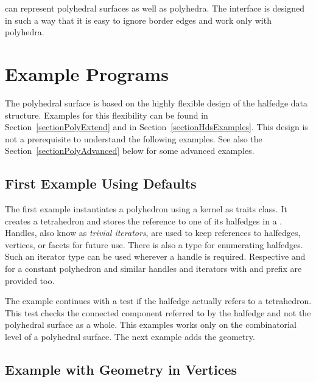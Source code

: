  can represent polyhedral
surfaces as well as polyhedra. The interface is designed in such a way
that it is easy to ignore border edges and work only with polyhedra.


\section{Example Programs}
\label{sectionPolyExamples}

The polyhedral surface is based on the highly flexible design of the
halfedge data structure. Examples for this flexibility can be found in
Section~\ref{sectionPolyExtend} and in Section~\ref{sectionHdsExamples}. 
This design is not a prerequisite to understand the following examples.
See also the Section~\ref{sectionPolyAdvanced} below for some advanced 
examples.

\subsection{First Example Using Defaults}

The first example instantiates a polyhedron using a kernel as traits
class. It creates a tetrahedron and stores the reference to one of its
halfedges in a . Handles, also know as
{\em trivial iterators}, are used to keep references to halfedges,
vertices, or facets for future use. There is also a 
type for enumerating halfedges. Such an iterator type can be used 
wherever a handle is required. Respective  and
 for a constant polyhedron and similar
handles and iterators with  and  prefix
are provided too.

The example continues with a test if the halfedge
actually refers to a tetrahedron. This test checks the connected 
component referred to by the halfedge  and not the polyhedral
surface as a whole. This examples works only on the combinatorial
level of a polyhedral surface. The next example adds the geometry.


\subsection{Example with Geometry in Vertices}

